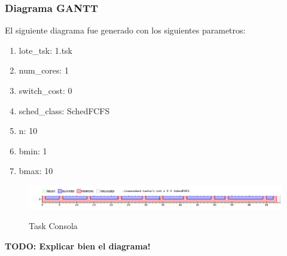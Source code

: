 \subsubsection{Diagrama GANTT}

El siguiente diagrama fue generado con los siguientes parametros:

\begin{enumerate}
	\item lote\_tsk: 1.tsk
	\item num\_cores: 1
	\item switch\_cost: 0
	\item sched\_class: SchedFCFS
	\item n: 10
	\item bmin: 1
	\item bmax: 10
\end{enumerate}

\begin{figure}[h]
    \includegraphics[width=\linewidth]{images/1.png}
    \label{fig:Task Consola}
    \caption{Task Consola}
\end{figure}

\textbf{TODO: Explicar bien el diagrama!}